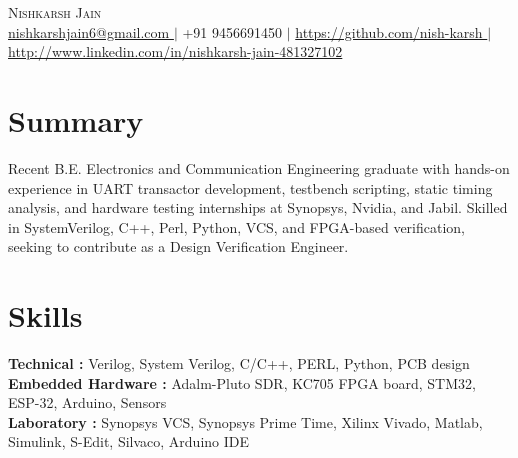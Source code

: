 \documentclass[letterpaper,11pt]{article}
\begin{document}
\begin{center}
    {\Huge \scshape Nishkarsh Jain} \\ \vspace{4pt}
    \small
\href{mailto:nishkarshjain6@gmail.com}{ nishkarshjain6@gmail.com } $|$ +91 9456691450 $|$ \href{ https://github.com/nish-karsh }{ https://github.com/nish-karsh } $|$ \href{ http://www.linkedin.com/in/nishkarsh-jain-481327102 }{ http://www.linkedin.com/in/nishkarsh-jain-481327102 }\end{center}

\section{Summary}
\small{ Recent B.E. Electronics and Communication Engineering graduate with hands-on experience in UART transactor development, testbench scripting, static timing analysis, and hardware testing internships at Synopsys, Nvidia, and Jabil. Skilled in SystemVerilog, C++, Perl, Python, VCS, and FPGA-based verification, seeking to contribute as a Design Verification Engineer. }

\section{Skills}
\begin{itemize}[leftmargin=0.15in, label={}]
  \small{\item{
    \textbf{ Technical :} Verilog, System Verilog, C/C++, PERL, Python, PCB design \\
    \textbf{ Embedded Hardware :} Adalm-Pluto SDR, KC705 FPGA board, STM32, ESP-32, Arduino, Sensors \\
    \textbf{ Laboratory :} Synopsys VCS, Synopsys Prime Time, Xilinx Vivado, Matlab, Simulink, S-Edit, Silvaco, Arduino IDE \\
  }}
\end{itemize}
\end{document}
